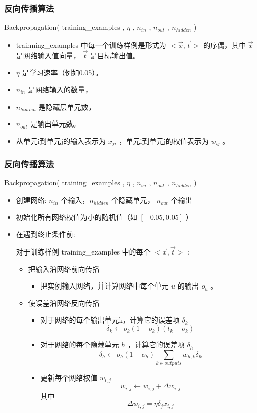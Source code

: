 \documentclass{beamer}
\begin{document}
\begin{frame}
\frametitle{反向传播算法}
\label{sec-3-5}


Backpropagation( training\_{}examples , $\eta$ , $n_{in}$ , $n_{out}$ , $n_{hidden}$ )
\begin{itemize}
\item trainning\_{}examples 中每一个训练样例是形式为 $<\vec{x},\vec{t}>$ 的序偶，其中 $\vec{x}$ 是网络输入值向量， $\vec{t}$ 是目标输出值。
\item $\eta$ 是学习速率（例如0.05）。
\item $n_{in}$ 是网络输入的数量，
\item $n_{hidden}$ 是隐藏层单元数，
\item $n_{out}$ 是输出单元数。
\item 从单元i到单元j的输入表示为 $x_{ji}$ ，单元i到单元j的权值表示为 $w_{ij}$ 。
\end{itemize}
\end{frame}
\begin{frame}
\frametitle{反向传播算法}
\label{sec-3-6}

Backpropagation( training\_{}examples , $\eta$ , $n_{in}$ , $n_{out}$ , $n_{hidden}$ )
\begin{itemize}
\item 创建网络: $n_{in}$ 个输入，$n_{hidden}$ 个隐藏单元， $n_{out}$ 个输出
\item 初始化所有网络权值为小的随机值（如 $[-0.05,0.05]$ ）
\item 在遇到终止条件前:

     对于训练样例 training\_{}examples 中的每个 $<\vec{x},\vec{t}>$ :
\begin{itemize}
\item 把输入沿网络前向传播
\begin{itemize}
\item 把实例输入网络，并计算网络中每个单元 $u$ 的输出 $o_u$ 。
\end{itemize}
\item 使误差沿网络反向传播
\begin{itemize}
\item 对于网络的每个输出单元k，计算它的误差项 $\delta_{k}$
                   \[\delta_{k} \leftarrow o_{k}(1-o_{k})(t_{k}-o_{k})\]
\item 对于网络的每个隐藏单元 $h$ ，计算它的误差项 $\delta_h$
                  \[\delta_{h} \leftarrow o_{h}(1-o_{h})\sum_{k \in outputs}w_{h,k}\delta_{k}\]
\item 更新每个网络权值 $w_{i,j}$
                  \[w_{i,j} \leftarrow w_{i,j} + \Delta w_{i,j}\]
               其中
                  \[\Delta w_{i,j} = \eta \delta_{j} x_{i,j}\]
\end{itemize}
\end{itemize}
\end{itemize}
\end{frame}
\end{document}
